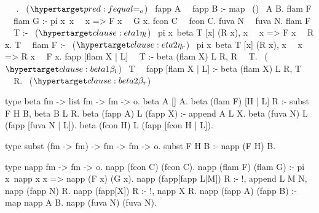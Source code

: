 \begin{elpicode}
~  ~.                           ~($\customlabel{pred:fequal}{\Eo}$)~
fapp A ~\Eo~fapp B :- map ~(\Eo)~ A B.
flam F ~\Eo~flam G :- pi x\ x ~\Eo~x => F x ~\Eo~G x.
fcon C ~\Eo~fcon C.
fuva N ~\Eo~fuva N.
flam F ~\Eo~T :-                                       ~($\customlabel{clause:eta1}{\eta_l}$)~
  pi x\ beta T [x] (R x), x ~\Eo~x => F x ~\Eo~R x.
T ~\Eo~flam F :-                                       ~($\customlabel{clause:eta2}{\eta_r}$)~
  pi x\ beta T [x] (R x), x ~\Eo~x => R x ~\Eo~F x.
fapp [flam X | L] ~\Eo~T :- beta (flam X) L R, R ~\Eo~T. ~($\customlabel{clause:beta1}{\beta_l}$)~
T ~\Eo~fapp [flam X | L] :- beta (flam X) L R, T ~\Eo~R. ~($\customlabel{clause:beta2}{\beta_r}$)~

type beta fm -> list fm -> fm -> o.
beta A [] A.
beta (flam F) [H | L] R :- subst F H B,
  beta B L R. %
beta (fapp A) L (fapp X) :- append A L X.
beta (fuva N) L (fapp [fuva N | L]).
beta (fcon H) L (fapp [fcon H | L]).

type subst (fm -> fm) -> fm -> fm -> o.
subst F H B :- napp (F H) B. %

type napp fm -> fm -> o.
napp (fcon C) (fcon C).
napp (flam F) (flam G) :- pi x\ napp x x => napp (F x) (G x).
napp (fapp[fapp L|M]) R :- !, append L M N, napp (fapp N) R.
napp (fapp[X]) R :- !, napp X R.
napp (fapp A) (fapp B) :- map napp A B.
napp (fuva N) (fuva N).
\end{elpicode}

